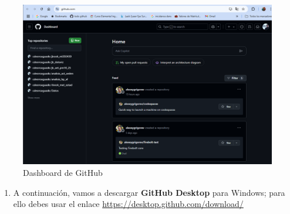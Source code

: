 \documentclass[
]{book}
\providecommand{\tightlist}{%
  \setlength{\itemsep}{0pt}\setlength{\parskip}{0pt}}
\begin{document}
\begin{figure}

{\centering \includegraphics[width=1\linewidth]{images/gh5} 

}

\caption{Dashboard de GitHub}\label{fig:github-d-fig}
\end{figure}

\begin{enumerate}
\def\labelenumi{\arabic{enumi}.}
\setcounter{enumi}{3}
\tightlist
\item
  A continuación, vamos a descargar \textbf{GitHub Desktop} para Windows; para ello debes usar el enlace \url{https://desktop.github.com/download/}
\end{enumerate}
\end{document}
